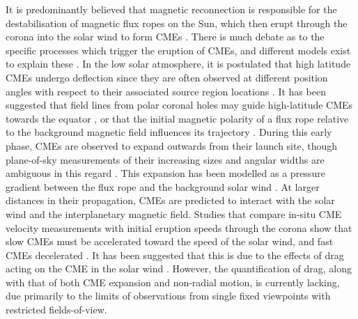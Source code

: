 \documentclass[preprint2]{aastex}
\begin{document}
It is predominantly believed that magnetic reconnection is responsible for the destabilisation of magnetic flux ropes on the Sun, which then erupt through the corona into the solar wind to form CMEs \citep{2006GMS...165...43M}. There is much debate as to the specific processes which trigger the eruption of CMEs, and different models exist to explain these \citep{1995ApJ...446..377F, 1996JGR...10127499C, 1999ApJ...510..485A, 2006PhRvL..96y5002K, 2007ApJ...671L..77V}. In the low solar atmosphere, it is postulated that high latitude CMEs undergo deflection since they are often observed at different position angles with respect to their associated source region locations \citep{2009SoPh..259..143X}. It has been suggested that field lines from polar coronal holes may guide high-latitude CMEs towards the equator \citep{angeo-27-4491-2009}, or that the initial magnetic polarity of a flux rope relative to the background magnetic field influences its trajectory \citep{2005A&A...432..331C, 2001SoPh..203..119F}. During this early phase, CMEs are observed to expand outwards from their launch site, though plane-of-sky measurements of their increasing sizes and angular widths are ambiguous in this regard \citep{2009CEAB...33..115G}. This expansion has been modelled as a pressure gradient between the flux rope and the background solar wind \citep{2004ApJ...600.1035R, 1999JGR...104..493O}. At larger distances in their propagation, CMEs are predicted to interact with the solar wind and the interplanetary magnetic field. Studies that compare in-situ CME velocity measurements with initial eruption speeds through the corona show that slow CMEs must be accelerated toward the speed of the solar wind, and fast CMEs decelerated \citep{2009SoPh..256..149M, 2003JGRA..108.1039G}. It has been suggested that this is due to the effects of drag acting on the CME in the solar wind \citep{2006SoPh..233..233T, 2004SoPh..221..135C}. However, the quantification of drag, along with that of both CME expansion and non-radial motion, is currently lacking, due primarily to the limits of observations from single fixed viewpoints with restricted fields-of-view.
\end{document}
